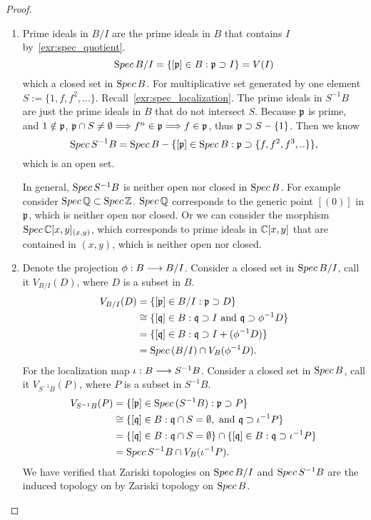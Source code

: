 \documentclass[11pt,fleqn]{book}
\begin{document}
\begin{proof}
\begin{enumerate}[label=(\alph*)]
\item Prime ideals in $B/I$ are the prime ideals in $B$ that  contains $I$ by~\ref{exr:spec_quotient}.
$$
{\text Spec\,} B/I=\{[{\mathfrak p}]\in B:{\mathfrak p}\supset I\}=V(I)
$$
which a closed set in ${\text Spec\,} B$.
For multiplicative set generated by one element $S:=\{1,f,f^2,...\}$. Recall~\ref{exr:spec_localization}. The prime ideals in $S^{-1}B$ are just the prime ideals in $B$ that do not intersect $S$. 
Because ${\mathfrak p}$ is prime, and $1\notin {\mathfrak p}$, ${\mathfrak p}\cap S\neq \emptyset\Longrightarrow f^n\in {\mathfrak p}\Longrightarrow f\in {\mathfrak p}$, thus ${\mathfrak p}\supset S-\{1\}$. Then we know
$$
{\text Spec\,} S^{-1}B={\text Spec\,} B-\{[{\mathfrak p}]\in {\text Spec\,} B: {\mathfrak p}\supset \{f,f^2,f^3,..\}\},
$$
which is an open set.

In general, ${\text Spec\,} S^{-1}B$ is neither open nor closed in ${\text Spec\,} B$. For example consider ${\text Spec\,}\mathbb Q \subset{\text Spec\,} \mathbb Z$.
${\text Spec\,}\mathbb Q$ corresponds to the generic point $[(0)]$ in ${\mathfrak p}$, which is neither open nor closed. Or we can consider the morphism ${\text Spec\,} \mathbb C[x,y]_{(x,y)}$, which corresponds to prime ideals in $\mathbb C[x,y]$ that are contained in $(x,y)$, which is neither open nor closed.
\item Denote the projection $\phi:B\longrightarrow B/I$. Consider a closed set in ${\text Spec\,} B/I$, call it $V_{B/I}(D)$, where $D$ is a subset in $B$.
$$
\begin{aligned}
V_{B/I}(D)&=\{[{\mathfrak p}]\in B/I:{\mathfrak p}\supset D\}\\
&\cong \{[\mathfrak q]\in B:\mathfrak q\supset I\text{ and }\mathfrak q\supset \phi^{-1}D\}\\
&=\{[\mathfrak q]\in B:\mathfrak q\supset I+(\phi^{-1}D)\}\\
&={\text Spec\,}(B/I)\cap V_{B}(\phi^{-1}D).
\end{aligned}
$$
For the localization map $\iota:B\longrightarrow S^{-1}B$. Consider a closed set in ${\text Spec\,} B$, call it $V_{S^{-1}B}(P)$, where $P$ is a subset in $S^{-1}B$.
$$
\begin{aligned}
V_{S^{-1}B}(P)&=\{[{\mathfrak p}]\in {\text Spec\,} (S^{-1}B):{\mathfrak p}\supset P\}\\
&\cong\{[\mathfrak q]\in B: \mathfrak q\cap S=\emptyset,\text{ and } \mathfrak q\supset \iota^{-1} P\}\\
&=\{[\mathfrak q]\in B: \mathfrak q\cap S=\emptyset\}\cap\{[\mathfrak q]\in B: \mathfrak q\supset \iota^{-1} P\}\\
&={\text Spec\,} S^{-1}B\cap V_B(\iota^{-1}P).
\end{aligned}
$$
We have verified that Zariski topologies on ${\text Spec\,} B/I$ and ${\text Spec\,} S^{-1}B$ are the induced topology on by Zariski topology on ${\text Spec\,} B$.
\end{enumerate}
\end{proof}
\end{document}
